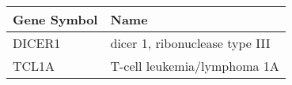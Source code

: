 \begin{tabular}{ll}
\toprule
Gene Symbol &                           Name \\
\midrule
     DICER1 & dicer 1, ribonuclease type III \\
      TCL1A &    T-cell leukemia/lymphoma 1A \\
\bottomrule
\end{tabular}
